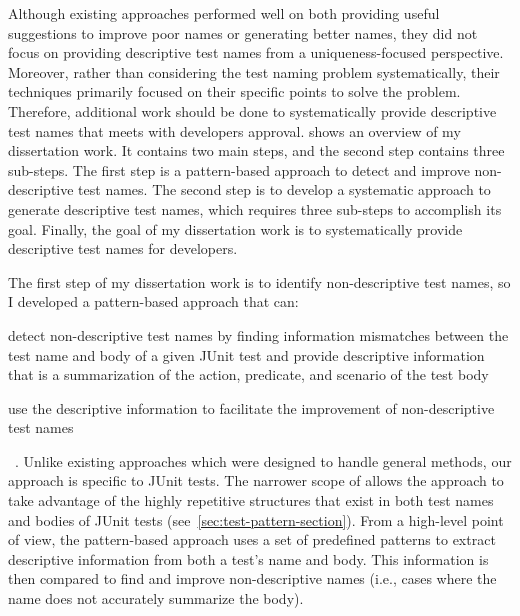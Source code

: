 Although existing approaches performed well on both providing useful suggestions to improve poor names or generating better names, they did not focus on providing descriptive test names from a uniqueness-focused perspective.
%
Moreover, rather than considering the test naming problem systematically, their techniques primarily focused on their specific points to solve the problem. 
%
Therefore, additional work should be done to systematically provide descriptive test names that meets with developers approval.
%
 shows an overview of my dissertation work.
%
It contains two main steps, and the second step contains three sub-steps.
%
The first step is a pattern-based approach to detect and improve non-descriptive test names.
%
The second step is to develop a systematic approach to generate descriptive test names, which requires three sub-steps to accomplish its goal. 
%
Finally, the goal of my dissertation work is to systematically provide descriptive test names for developers.


The first step of my dissertation work is to identify non-descriptive test names, so I developed a pattern-based approach that can:
\begin{enumerate*}
\item detect non-descriptive test names by finding information mismatches between the test name and body of a given JUnit test and provide descriptive information that is a summarization of the action, predicate, and scenario of the test body
\item use the descriptive information to facilitate the improvement of non-descriptive test names
\end{enumerate*}~\cite{wu2020pattern}.
%
Unlike existing approaches which were designed to handle general methods, our approach is specific to JUnit tests.
%
The narrower scope of allows the approach to take advantage of the highly repetitive structures that exist in both test names and bodies of JUnit tests (see~\cref{sec:test-pattern-section}).
%
From a high-level point of view, the pattern-based approach uses a set of predefined patterns to extract descriptive information from both a test's name and body.
%
This information is then compared to find and improve non-descriptive names (i.e., cases where the name does not accurately summarize the body).


